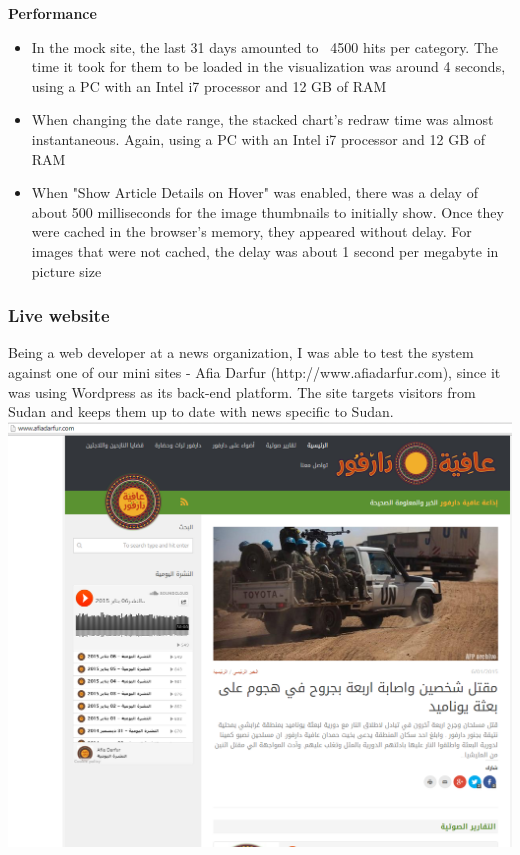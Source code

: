 \documentclass[12pt]{article}
\begin{document}
{\noindent\textbf{Performance} 
\begin{itemize}
\item In the mock site, the last 31 days amounted to ~4500 hits per category. The time it took for them to be loaded in the visualization was around 4 seconds, using a PC with an Intel i7 processor and 12 GB of RAM
\item When changing the date range, the stacked chart's redraw time was almost instantaneous. Again, using a PC with an Intel i7 processor and 12 GB of RAM
\item When "Show Article Details on Hover" was enabled, there was a delay of about 500 milliseconds for the image thumbnails to initially show. Once they were cached in the browser's memory, they appeared without delay. For images that were not cached, the delay was about 1 second per megabyte in picture size
\end{itemize}

\newpage

\subsubsection{Live website}
Being a web developer at a news organization, I was able to test the system against one of our mini sites - Afia Darfur (http://www.afiadarfur.com), since it was using Wordpress as its back-end platform. The site targets visitors from Sudan and keeps them up to date with news specific to Sudan. \\

\noindent\includegraphics[scale=0.4]{img/afiadarfur_main} \\

}
\end{document}
